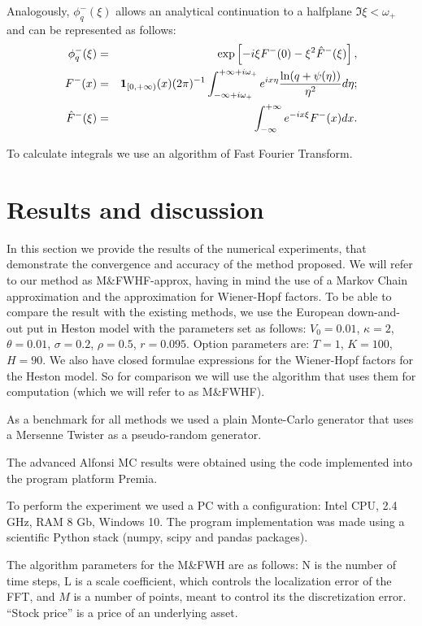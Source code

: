 \documentclass[a4paper]{jpconf}
\begin{document}
Analogously, $\phi^-_q(\xi)$ allows an analytical continuation to a halfplane $\Im \xi<\omega_+$ and can be represented as follows:
\begin{eqnarray*}
	\phi^-_q(\xi)&=&\exp\left[-i\xi F^-(0)-\xi^2\hat{F}^-(\xi)\right],\\
	F^-(x)&=&{\bf 1}_{[0,+\infty)}(x)(2\pi)^{-1}
	\int_{-\infty+i\omega_+}^{+\infty+i\omega_+}e^{ix\eta}\frac{\ln(q+\psi(\eta))}
	{\eta^2}d\eta;\\
	\hat{F}^-(\xi)&=&\int_{-\infty}^{+\infty}e^{-ix\xi}F^-(x)dx.
\end{eqnarray*}

To calculate integrals we use an algorithm of Fast Fourier Transform.

\section{Results and discussion}

In this section we provide the results of the numerical experiments, that demonstrate the convergence and accuracy of the method proposed. We will refer to our method as M\&FWHF-approx, having in mind the use of a Markov Chain approximation and the approximation for Wiener-Hopf factors. To be able to compare the result with the existing methods, we use the European down-and-out put in Heston model with the parameters set as follows: $V_0=0.01$, $\kappa=2$, $\theta=0.01$, $\sigma=0.2$, $\rho=0.5 $, $r=0.095$. Option parameters are: $T=1$, $K=100$, $H=90$.
We also have closed formulae expressions for the Wiener-Hopf factors for the Heston model. So for comparison we will use the algorithm \cite{kudr_rod} that uses them for computation (which we will refer to as M\&FWHF).

As a benchmark for all methods we used a plain Monte-Carlo generator that uses a Mersenne Twister as a pseudo-random generator. 

The advanced Alfonsi \cite{alfonsi} MC results were obtained using the code implemented into the program platform Premia.

To perform the experiment we used a PC with a configuration: Intel CPU, 2.4 GHz, RAM 8 Gb, Windows 10. The program implementation was made using a scientific Python stack (numpy, scipy and pandas packages).

The algorithm parameters for the M\&FWH are as follows: N is the number of time steps, L is a scale coefficient, which controls the localization error of the FFT, and $M$ is a number of points, meant to control its the discretization error. ``Stock price'' is a price of an underlying asset.
\end{document}
